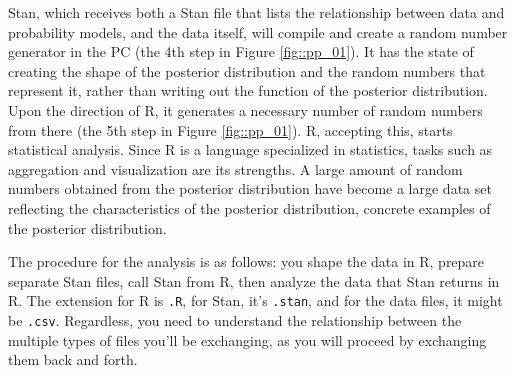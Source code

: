 \documentclass{ltjsbook}
\begin{document}
Stan, which receives both a Stan file that lists the relationship between data and probability models, and the data itself, will compile and create a random number generator in the PC (the 4th step in Figure \ref{fig::pp_01}). It has the state of creating the shape of the posterior distribution and the random numbers that represent it, rather than writing out the function of the posterior distribution. Upon the direction of R, it generates a necessary number of random numbers from there (the 5th step in Figure \ref{fig::pp_01}). R, accepting this, starts statistical analysis. Since R is a language specialized in statistics, tasks such as aggregation and visualization are its strengths. A large amount of random numbers obtained from the posterior distribution have become a large data set reflecting the characteristics of the posterior distribution, concrete examples of the posterior distribution.

The procedure for the analysis is as follows: you shape the data in R, prepare separate Stan files, call Stan from R, then analyze the data that Stan returns in R. The extension for R is \verb|.R|, for Stan, it's \verb|.stan|, and for the data files, it might be \verb|.csv|. Regardless, you need to understand the relationship between the multiple types of files you'll be exchanging, as you will proceed by exchanging them back and forth.



\end{document}
